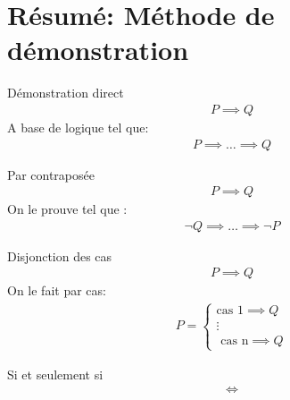 \section{Résumé: Méthode de démonstration}
\begin{parag}{Démonstration direct}
   \begin{align*} P \implies Q \end{align*}
   A base de logique tel que:
   \begin{align*} P \implies \ldots \implies Q \end{align*}
\end{parag}
\begin{parag}{Par contraposée}
   \begin{align*} P \implies Q \end{align*} 
   On le prouve tel que :
   \begin{align*} \neg Q \implies \ldots \implies \neg P \end{align*}
\end{parag}
\begin{parag}{Disjonction des cas}
    \begin{align*} P \implies Q \end{align*}
    On le fait par cas:
    \begin{align*} 
        P = \begin{cases}
            \text{cas 1} \implies Q\\
            \vdots\\
            \text{ cas n} \implies Q
        \end{cases}
    \end{align*}
\end{parag}

\begin{parag}{Si et seulement si}
    \begin{align*} \iff \end{align*}
\end{parag}

